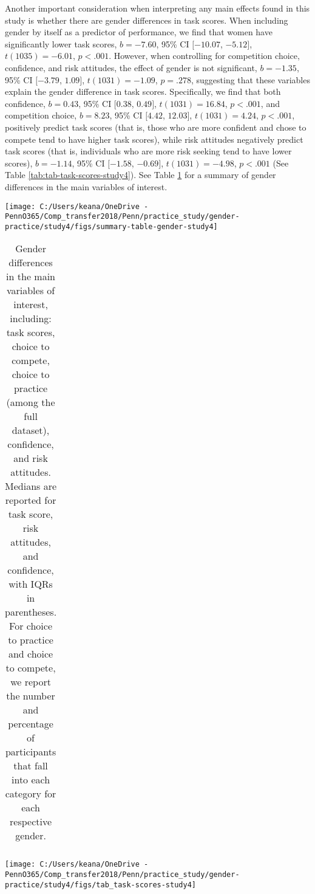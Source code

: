 \documentclass[letterpaper, nobind]{templates/ociamthesis}
\begin{document}
Another important consideration when interpreting any main effects found in this study is whether there are gender differences in task scores. When including gender by itself as a predictor of performance, we find that women have significantly lower task scores, \(b = -7.60\), 95\% CI \([-10.07\), \(-5.12]\), \(t(1035) = -6.01\), \(p < .001\). However, when controlling for competition choice, confidence, and risk attitudes, the effect of gender is not significant, \(b = -1.35\), 95\% CI \([-3.79\), \(1.09]\), \(t(1031) = -1.09\), \(p = .278\), suggesting that these variables explain the gender difference in task scores. Specifically, we find that both confidence, \(b = 0.43\), 95\% CI \([0.38\), \(0.49]\), \(t(1031) = 16.84\), \(p < .001\), and competition choice, \(b = 8.23\), 95\% CI \([4.42\), \(12.03]\), \(t(1031) = 4.24\), \(p < .001\), positively predict task scores (that is, those who are more confident and chose to compete tend to have higher task scores), while risk attitudes negatively predict task scores (that is, individuals who are more risk seeking tend to have lower scores), \(b = -1.14\), 95\% CI \([-1.58\), \(-0.69]\), \(t(1031) = -4.98\), \(p < .001\) (See Table \ref{tab:tab-task-scores-study4}). See Table \ref{tab:summary-table-gender-study4} for a summary of gender differences in the main variables of interest.

\begin{center}\texttt{[image: C:/Users/keana/OneDrive - PennO365/Comp\_transfer2018/Penn/practice\_study/gender-practice/study4/figs/summary-table-gender-study4]} \end{center}

\begin{table}[ht]
\centering
\begingroup\fontsize{0.1pt}{0.1pt}\selectfont
\begin{tabular}{r}
   \\ 
 \end{tabular}
\endgroup
\caption{Gender differences in the main variables of interest, including: task scores, choice to compete, choice to practice (among the full dataset), confidence, and risk attitudes. Medians are reported for task score, risk attitudes, and confidence, with IQRs in parentheses. For choice to practice and choice to compete, we report the number and percentage of participants that fall into each category for each respective gender.} 
\label{tab:summary-table-gender-study4}
\end{table}

\begin{center}\texttt{[image: C:/Users/keana/OneDrive - PennO365/Comp\_transfer2018/Penn/practice\_study/gender-practice/study4/figs/tab\_task-scores-study4]} \end{center}
\end{document}
